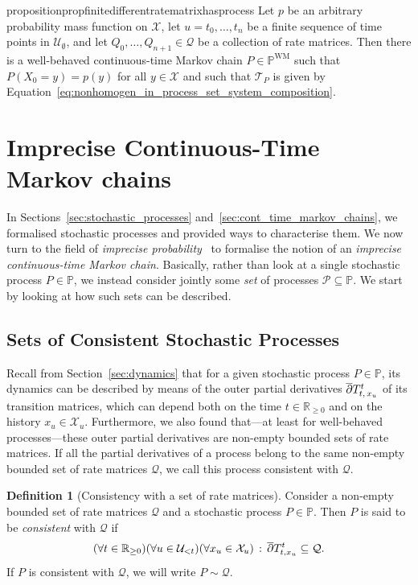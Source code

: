 \documentclass[10pt,a4paper]{paper}
\theoremstyle{definition}
\newtheorem{definition}{Definition}
\newcommand{\reals}{\mathbb{R}}
\newcommand{\realsnonneg}{\reals_{\geq 0}}
\newcommand{\states}{\mathcal{X}}
\newcommand{\processes}{\mathbb{P}}
\newcommand{\wmprocesses}{\processes^{\mathrm{WM}}}
\newcommand{\rateset}{\mathcal{Q}}
\begin{document}
\begin{restatable}{proposition}{propfinitedifferentratematrixhasprocess}
\label{prop:finite_different_rate_matrix_has_process}
Let $p$ be an arbitrary probability mass function on $\states$, let $u=t_0,\ldots,t_n$ be a finite sequence of time points in $\mathcal{U}_\emptyset$, and let $Q_0,\ldots,Q_{n+1}\in\rateset$ be a collection of rate matrices. Then there is a well-behaved continuous-time Markov chain $P\in\wmprocesses$ such that $P(X_0=y)=p(y)$ for all $y\in\mathcal{X}$ and such that $\mathcal{T}_P$ is given by Equation~\eqref{eq:nonhomogen_in_process_set_system_composition}.
\end{restatable}


\section{Imprecise Continuous-Time Markov chains}
\label{sec:iCTMC}

In Sections~\ref{sec:stochastic_processes} and~\ref{sec:cont_time_markov_chains}, we formalised stochastic processes and provided ways to characterise them. We now turn to the field of \emph{imprecise probability}~\cite{augustin2013:itip,Walley:1991vk} to formalise the notion of an \emph{imprecise continuous-time Markov chain}. Basically, rather than look at a single stochastic process $P\in\processes$, we instead consider jointly some \emph{set} of processes $\mathcal{P}\subseteq\processes$. We start by looking at how such sets can be described.

\subsection{Sets of Consistent Stochastic Processes}

Recall from Section~\ref{sec:dynamics} that for a given stochastic process $P\in\processes$, its dynamics can be described by means of the outer partial derivatives $\smash{\overline{\partial}}T_{t,\,x_u}^t$ of its transition matrices, which can depend both on the time $t\in\realsnonneg$ and on the history $x_u\in\states_u$. %
 Furthermore, we also found that---at least for well-behaved processes---these outer partial derivatives are non-empty bounded sets of rate matrices. If all the partial derivatives of a process belong to the same non-empty bounded set of rate matrices $\rateset$, we call this process consistent with $\rateset$.



\begin{definition}[Consistency with a set of rate matrices]\label{def:consistent_process}
Consider a non-empty bounded set of rate matrices $\rateset$ and a stochastic process $P\in\processes$. Then $P$ is said to be \emph{consistent} with $\rateset$ if
\begin{equation*}
(\forall t\in\realsnonneg)(\forall u\in\mathcal{U}_{<t})(\forall x_u\in\states_u)\,:\, \smash{\overline{\partial}}T_{t,x_u}^t \subseteq \rateset.
\vspace{4pt}
\end{equation*}
If $P$ is consistent with $\rateset$, we will write $P\sim\rateset$.
\end{definition}
\end{document}
